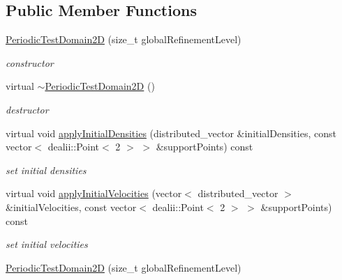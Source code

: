 \subsection*{Public Member Functions}
\begin{DoxyCompactItemize}
\item 
\hyperlink{classnatrium_1_1PeriodicTestDomain2D_a930da37a3e1be744aaf59e27ba956318}{Periodic\-Test\-Domain2\-D} (size\-\_\-t global\-Refinement\-Level)
\begin{DoxyCompactList}\small\item\em constructor \end{DoxyCompactList}\item 
\hypertarget{classnatrium_1_1PeriodicTestDomain2D_a81fe3504b294cd4d6219c360f465f84b}{virtual \hyperlink{classnatrium_1_1PeriodicTestDomain2D_a81fe3504b294cd4d6219c360f465f84b}{$\sim$\-Periodic\-Test\-Domain2\-D} ()}\label{classnatrium_1_1PeriodicTestDomain2D_a81fe3504b294cd4d6219c360f465f84b}

\begin{DoxyCompactList}\small\item\em destructor \end{DoxyCompactList}\item 
virtual void \hyperlink{classnatrium_1_1PeriodicTestDomain2D_ae2a3a181175afa80e73097e51ef8b242}{apply\-Initial\-Densities} (distributed\-\_\-vector \&initial\-Densities, const vector$<$ dealii\-::\-Point$<$ 2 $>$ $>$ \&support\-Points) const 
\begin{DoxyCompactList}\small\item\em set initial densities \end{DoxyCompactList}\item 
virtual void \hyperlink{classnatrium_1_1PeriodicTestDomain2D_a52663163abcc41edd8491db3ea4d3b4c}{apply\-Initial\-Velocities} (vector$<$ distributed\-\_\-vector $>$ \&initial\-Velocities, const vector$<$ dealii\-::\-Point$<$ 2 $>$ $>$ \&support\-Points) const 
\begin{DoxyCompactList}\small\item\em set initial velocities \end{DoxyCompactList}\item 
\hypertarget{classnatrium_1_1PeriodicTestDomain2D_a930da37a3e1be744aaf59e27ba956318}{\hyperlink{classnatrium_1_1PeriodicTestDomain2D_a930da37a3e1be744aaf59e27ba956318}{Periodic\-Test\-Domain2\-D} (size\-\_\-t global\-Refinement\-Level)}\label{classnatrium_1_1PeriodicTestDomain2D_a930da37a3e1be744aaf59e27ba956318}


\end{DoxyCompactItemize}
